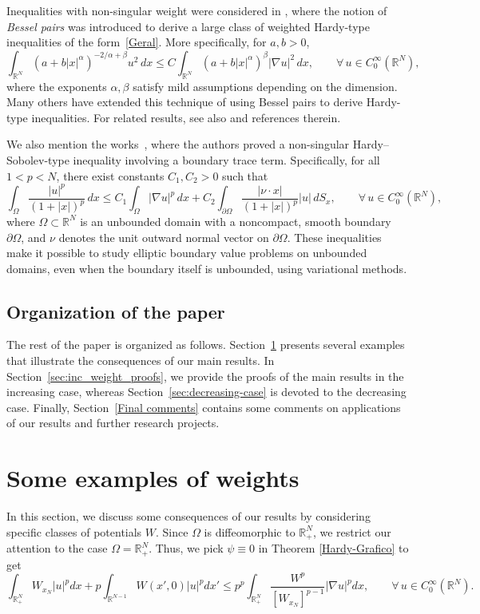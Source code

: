 \documentclass[12pt]{amsart}
\theoremstyle{definition}
\theoremstyle{plain}
\begin{document}
Inequalities with non-singular weight were considered in \cite{Ghoussoub-Moradifam}, where the 
notion of \emph{Bessel pairs} was introduced to derive a large class of weighted Hardy-type 
inequalities of the form~\eqref{Geral}. More specifically, for \( a, b > 0 \),
\[
\int_{\mathbb{R}^N} (a + b |x|^{\alpha})^{ - 2/\alpha+\beta} u^2 \, dx
\leq 
C \int_{\mathbb{R}^N} (a + b |x|^{\alpha})^{\beta} |\nabla u|^2 \, dx,\qquad \forall\, u \in C_0^\infty(\mathbb{R}^N),
\]
where the exponents \( \alpha, \beta \) satisfy mild assumptions depending on the dimension. Many 
others have extended this technique of using Bessel pairs to derive Hardy-type 
inequalities. 
For related results, see also \cite{MR2481073,Cossetti-DArca} and 
references therein. 


We also mention the works~\cite{MR860920,Lewis,Pfluger}, where the authors proved a non-singular 
Hardy–Sobolev-type inequality involving a boundary trace term. Specifically, for all \( 1 < p < N \), 
there exist constants \( C_1, C_2 > 0 \) such that  
\[
\int_\Omega \frac{|u|^p}{(1 + |x|)^p} \, dx
\leq 
C_1 \int_\Omega |\nabla u|^p \, dx
+ 
C_2 \int_{\partial\Omega} \frac{|\nu \cdot x|}{(1 + |x|)^p} |u| \, dS_x,
\qquad \forall\, u \in C_0^\infty(\mathbb{R}^N),
\]
where \( \Omega \subset \mathbb{R}^N \) is an unbounded domain with a noncompact, smooth 
boundary \( \partial\Omega \), and \( \nu \) denotes the unit outward normal vector 
on \( \partial\Omega \). 
These inequalities make it possible to study elliptic boundary value problems on unbounded domains, 
even when the boundary itself is unbounded, using variational methods.


\subsection{Organization of the paper} 
The rest of the paper is organized as follows. Section~\ref{subsecao-exemplo-1} 
presents several examples that illustrate 
the consequences of our main results. In Section~\ref{sec:inc_weight_proofs}, we provide 
the proofs of the main results 
in the increasing case, whereas Section~\ref{sec:decreasing-case} is devoted to the 
decreasing case. Finally, Section~\ref{Final comments} 
contains some comments on applications of our results and further research projects.


\section{Some examples of weights} \label{subsecao-exemplo-1}
In this section, we discuss some consequences of our results by considering specific 
classes of potentials \(W\). Since \(\Omega\) is diffeomorphic to \(\mathbb{R}^N_+\), 
we restrict our attention to the case \(\Omega = \mathbb{R}^N_+\). Thus, we pick $\psi\equiv 0$ in Theorem \ref{Hardy-Grafico} to get
		\begin{equation}\label{timao-campeao}
			\int_{\mathbb{R}^N_+} W_{x_N}|u|^pdx+p	\int_{\mathbb{R}^{N-1}}  
            W(x',0)|u|^{p}dx'\leq p^p\int_{\mathbb{R}^{N}_+} 
            \frac{W^p}{[W_{x_N}]^{p-1}} |\nabla u|^pdx, \qquad \forall \, u \in C_0^\infty(\mathbb{R}^N).
		\end{equation}
\end{document}

